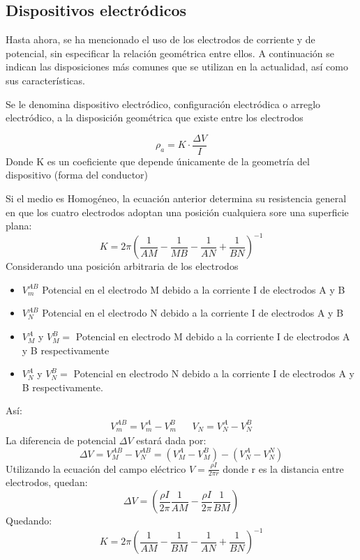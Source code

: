\subsection{Dispositivos electródicos}
Hasta ahora, se ha mencionado el uso de los electrodos de corriente y de potencial, sin especificar la relación geométrica entre ellos. A continuación se indican las disposiciones más comunes que se utilizan en la actualidad, así como sus características.

Se le denomina dispositivo electródico, configuración electródica o arreglo electródico, a la disposición geométrica que existe entre los electrodos

\begin{equation}
  \rho_a = K\cdot \frac{\Delta V}{I}
\end{equation}
Donde K es un coeficiente que depende únicamente de la geometría del dispositivo (forma del conductor)

Si el medio es Homogéneo, la ecuación anterior determina su resistencia
general en que los cuatro electrodos adoptan una posición cualquiera sore una superficie plana:
\begin{equation}
  K = 2\pi\left(\frac{1}{AM} - \frac{1}{MB} - \frac{1}{AN} + \frac{1}{BN}\right)^{-1}
\end{equation}
Considerando una posición arbitraria de los electrodos

\begin{notation}
  \begin{itemize}
    \item $V_{m}^{AB}$ Potencial en el electrodo M debido a la corriente I de electrodos A y B
    \item $V_{N}^{AB}$ Potencial en el electrodo N debido a la corriente I de electrodos A y B
    \item $V_{M}^{A}$ y $V_{M}^{B}=$ Potencial en electrodo M debido a la corriente I de electrodos A y B respectivamente
    \item $V_{N}^{A}$ y $V_{N}^{B}=$ Potencial en electrodo N debido a la corriente I de electrodos A y B respectivamente.
  \end{itemize}
\end{notation}
Así:
\begin{align}
  V_m^{AB} = V_m^A - V_m^B&& V_N =V_N^A - V_N^B
\end{align}
La diferencia de potencial $\Delta V$ estará dada por:
\begin{equation}
  \Delta V = V_M^{AB} - V_N^{AB} =\left(V_M^A - V_M^B \right) -\left(V_N^A -V_N^{N} \right)
\end{equation}
Utilizando la ecuación del campo eléctrico $V=\frac{\rho I}{2\pi r}$ donde r es la distancia entre electrodos, quedan:
\begin{equation*}
  \Delta V = \left(\frac{\rho I}{2\pi}\frac{1}{AM} -\frac{\rho I}{2\pi}\frac{1}{BM}  \right)
\end{equation*}
Quedando:
\begin{equation}
  K = 2\pi\left(\frac{1}{AM} - \frac{1}{BM} - \frac{1}{AN} + \frac{1}{BN}\right)^{- 1}
\end{equation}

